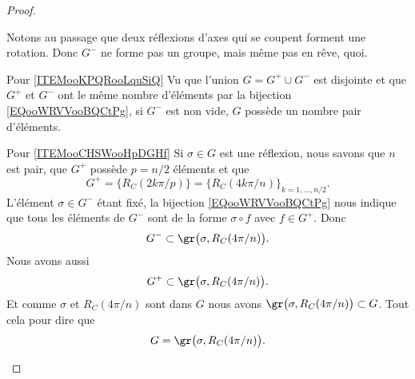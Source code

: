 \begin{proof}
\begin{subproof}
\begin{subproof}
			Notons au passage que deux réflexions d'axes qui se coupent forment une rotation. Donc \( G^-\) ne forme pas un groupe, mais même pas en rêve, quoi.
			\item[Pour \ref{ITEMooKPQRooLquSiQ}]
			Vu que l'union \( G=G^+\cup G^-\) est disjointe et que \( G^+\) et \( G^-\) ont le même nombre d'éléments par la bijection \ref{EQooWRVVooBQCtPg}, si \( G^-\) est non vide, \( G\) possède un nombre pair d'éléments.
			\item[Pour \ref{ITEMooCHSWooHpDGHf}]
			Si \( \sigma\in G\) est une réflexion, nous savons que \( n\) est pair, que \( G^+\) possède \( p=n/2\) éléments et que
			\begin{equation}
				G^+=\{  R_C(2k\pi/p)  \}=\{  R_C(4k\pi/n) \}_{k=1,\ldots, n/2}.
			\end{equation}
			L'élément \( \sigma\in G^- \) étant fixé, la bijection \eqref{EQooWRVVooBQCtPg} nous indique que tous les éléments de \( G^-\) sont de la forme \( \sigma\circ f\) avec \( f\in G^+\). Donc
			\begin{equation}
				G^{-}\subset \gr\big( \sigma, R_C(4\pi/n)  \big).
			\end{equation}
			Nous avons aussi
			\begin{equation}
				G^+\subset \gr\big( \sigma,  R_C(4\pi/n)  \big).
			\end{equation}
			Et comme \( \sigma\) et \(  R_C(4\pi/n)  \) sont dans \( G\) nous avons \( \gr\big( \sigma ,  R_C(4\pi/n)  \big)\subset G\). Tout cela pour dire que
			\begin{equation}
				G=\gr\big( \sigma,  R_C(4\pi/n) \big).
			\end{equation}


\end{subproof}
\end{subproof}
\end{proof}

